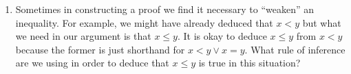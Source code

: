 \begin{enumerate}
 \rule{0pt}{0pt}
 
 \wbvfill
 
\workbookpagebreak

\item Sometimes in constructing a proof we find it necessary to ``weaken'' an inequality.  For example,
we might have already deduced that $x < y$ but what we need in our argument is that $x \leq y$.  It is
okay to deduce $x \leq y$ from $x < y$ because the former is just shorthand for $x<y \lor x=y$.  What
rule of inference are we using in order to deduce that $x \leq y$ is true in this situation?


\wbvfill

\end{enumerate}
